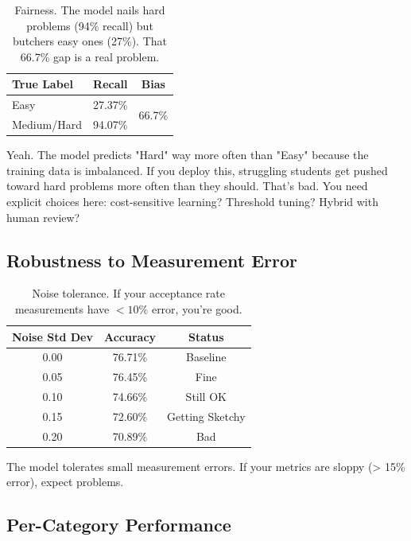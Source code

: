 \documentclass[conference]{IEEEtran}
\begin{document}
\begin{table}[h]
\centering
\small
\begin{tabular}{l|c|c}
\toprule
\textbf{True Label} & \textbf{Recall} & \textbf{Bias} \\
\midrule
Easy & 27.37\% & \multirow{2}{*}{66.7\%} \\
Medium/Hard & 94.07\% & \\
\bottomrule
\end{tabular}
\caption{Fairness. The model nails hard problems (94\% recall) but butchers easy ones (27\%). That 66.7\% gap is a real problem.}
\end{table}

Yeah. The model predicts "Hard" way more often than "Easy" because the training data is imbalanced. If you deploy this, struggling students get pushed toward hard problems more often than they should. That's bad. You need explicit choices here: cost-sensitive learning? Threshold tuning? Hybrid with human review?

\subsection{Robustness to Measurement Error}

\begin{table}[h]
\centering
\small
\begin{tabular}{c|c|c}
\toprule
\textbf{Noise Std Dev} & \textbf{Accuracy} & \textbf{Status} \\
\midrule
0.00 & 76.71\% & Baseline \\
0.05 & 76.45\% & Fine \\
0.10 & 74.66\% & Still OK \\
0.15 & 72.60\% & Getting Sketchy \\
0.20 & 70.89\% & Bad \\
\bottomrule
\end{tabular}
\caption{Noise tolerance. If your acceptance rate measurements have $< 10\%$ error, you're good.}
\end{table}

The model tolerates small measurement errors. If your metrics are sloppy (> 15\% error), expect problems.

\subsection{Per-Category Performance}
\end{document}
